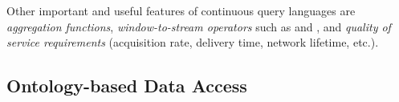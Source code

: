 Other important and useful features of continuous query languages are \emph{aggregation functions},
\emph{window-to-stream operators} such as  and  \cite{Arasu_2006}, and
\emph{quality of service requirements} \cite{Galpin_09} (acquisition rate, delivery time, network lifetime, etc.).





\subsection{Ontology-based Data Access}
\label{obda}

